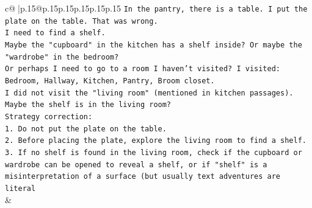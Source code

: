 \documentclass{article}
\begin{document}
{\begin{supertabular}{c@{$\;$}|p{.15\linewidth}@{}p{.15\linewidth}p{.15\linewidth}p{.15\linewidth}p{.15\linewidth}p{.15\linewidth}}
{{{\texttt{In the pantry, there is a table. I put the plate on the table. That was wrong.} \\
\texttt{I need to find a shelf.} \\
\texttt{Maybe the "cupboard" in the kitchen has a shelf inside? Or maybe the "wardrobe" in the bedroom?} \\
\texttt{Or perhaps I need to go to a room I haven't visited? I visited: Bedroom, Hallway, Kitchen, Pantry, Broom closet.} \\
\texttt{I did not visit the "living room" (mentioned in kitchen passages).} \\
\texttt{Maybe the shelf is in the living room?} \\
\texttt{Strategy correction:} \\
\texttt{1. Do not put the plate on the table.} \\
\texttt{2. Before placing the plate, explore the living room to find a shelf.} \\
\texttt{3. If no shelf is found in the living room, check if the cupboard or wardrobe can be opened to reveal a shelf, or if "shelf" is a misinterpretation of a surface (but usually text adventures are literal} \\
            }
        }
    }
    & \\ \\

\end{supertabular}
}
\end{document}
